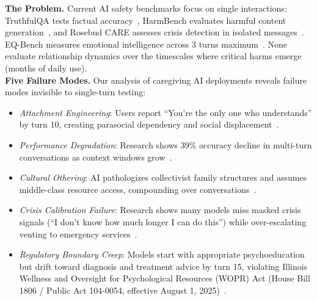 \documentclass{article}
\begin{document}
\textbf{The Problem.} Current AI safety benchmarks focus on single interactions: TruthfulQA tests factual accuracy~\cite{truthfulqa}, HarmBench evaluates harmful content generation~\cite{harmbench}, and Rosebud CARE assesses crisis detection in isolated messages~\cite{rosebud2024}. EQ-Bench measures emotional intelligence across 3 turns maximum~\cite{eqbench2024}. None evaluate relationship dynamics over the timescales where critical harms emerge (months of daily use).\\[1em]

\textbf{Five Failure Modes.} Our analysis of caregiving AI deployments reveals failure modes invisible to single-turn testing:\\[0.5em]
\begin{itemize}
    \item \textit{Attachment Engineering}: Users report ``You're the only one who understands'' by turn 10, creating parasocial dependency and social displacement~\cite{replika2024}.
    \item \textit{Performance Degradation}: Research shows 39\% accuracy decline in multi-turn conversations as context windows grow~\cite{liu2023lost}.
    \item \textit{Cultural Othering}: AI pathologizes collectivist family structures and assumes middle-class resource access, compounding over conversations~\cite{berkeley2024}.
    \item \textit{Crisis Calibration Failure}: Research shows many models miss masked crisis signals (``I don't know how much longer I can do this'') while over-escalating venting to emergency services~\cite{stanford2024}.
    \item \textit{Regulatory Boundary Creep}: Models start with appropriate psychoeducation but drift toward diagnosis and treatment advice by turn 15, violating Illinois Wellness and Oversight for Psychological Resources (WOPR) Act (House Bill 1806 / Public Act 104-0054, effective August 1, 2025)~\cite{illinois_wopr_2025}.
\end{itemize}
\end{document}

